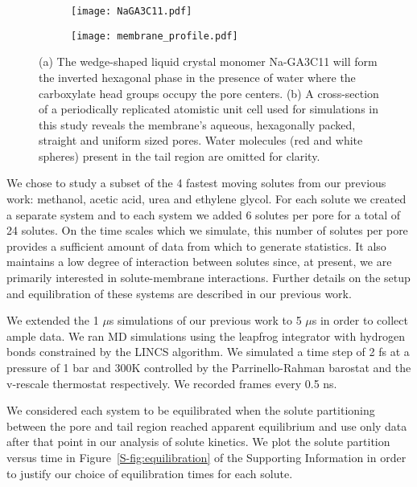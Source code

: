 \documentclass[journal=ancac3,manuscript=article,layout=twocolumn]{achemso}
\begin{document}
  \begin{figure*}
  \centering
  \begin{subfigure}{0.4\textwidth}
  \centering
  \vspace{1.1cm}
  \texttt{[image: NaGA3C11.pdf]}
  \vspace{0.6cm}
  \caption{}\label{fig:monomer_structure}
  \end{subfigure}
  \begin{subfigure}{0.5\textwidth}
  \centering
  \texttt{[image: membrane\_profile.pdf]}
  \caption{}\label{fig:membrane_profile}
  \end{subfigure}
  \caption{(a) The wedge-shaped liquid crystal monomer Na-GA3C11 will form the inverted
  hexagonal phase in the presence of water where the carboxylate head groups occupy the
  pore centers. (b) A cross-section of a periodically replicated atomistic unit cell 
  used for simulations in this study reveals the membrane's aqueous, hexagonally packed,
  straight and uniform sized pores. Water molecules (red and white spheres) present in 
  the tail region are omitted for clarity.}\label{fig:membrane_structure}
  \end{figure*}
  
  We chose to study a subset of the 4 fastest moving solutes from our previous
  work: methanol, acetic acid, urea and ethylene glycol. For each solute we 
  created a separate system and to each system we added 6 solutes per pore 
  for a total of 24 solutes. On the time scales which we simulate, this number
  of solutes per pore provides a sufficient amount of data from which to 
  generate statistics. It also maintains a low degree of interaction between
  solutes since, at present, we are primarily interested in solute-membrane 
  interactions. Further details on the setup and equilibration of these systems
  are described in our previous work.\cite{coscia_chemically_2019}
  
  We extended the 1 $\mu$s simulations of our previous work to 5 $\mu$s in order
  to collect ample data. We ran MD simulations using the leapfrog integrator with 
  hydrogen bonds constrained by the LINCS algorithm. We simulated a time step of 2 fs at
  a pressure of 1 bar and 300K controlled by the Parrinello-Rahman barostat and
  the v-rescale thermostat respectively. We recorded frames every 0.5 ns.
  
  We considered each system to be equilibrated when the solute partitioning between the 
  pore and tail region reached apparent equilibrium and use only data after that point
  in our analysis of solute kinetics. We plot the solute partition versus time in
  Figure~\ref{S-fig:equilibration} of the Supporting Information in order to justify
  our choice of equilibration times for each solute.
\end{document}
